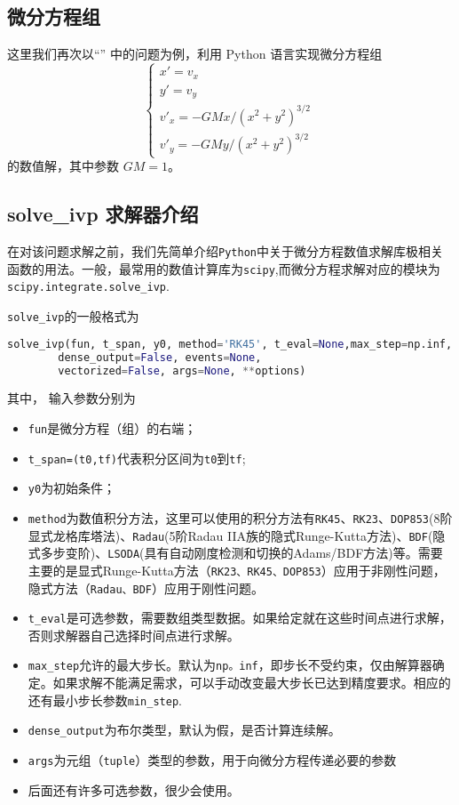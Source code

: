 \subsection{微分方程组}
这里我们再次以“” 中的问题为例，利用 Python 语言实现微分方程组
\begin{equation}\label{eq_PyIVP_10}
\begin{cases}
x' = v_x\\
y' = v_y\\
v'_x = -GMx/(x^2 + y^2)^{3/2}\\
v'_y = -GMy/(x^2 + y^2)^{3/2}
\end{cases}~
\end{equation}
的数值解，其中参数 $GM=1$。
\subsection{solve\_ivp 求解器介绍}
在对该问题求解之前，我们先简单介绍\verb`Python`中关于微分方程数值求解库极相关函数的用法。一般，最常用的数值计算库为\verb`scipy`,而微分方程求解对应的模块为\verb`scipy.integrate.solve_ivp`.

 \verb`solve_ivp`的一般格式为
 \begin{lstlisting}[language=python]
 solve_ivp(fun, t_span, y0, method='RK45', t_eval=None,max_step=np.inf,
        dense_output=False, events=None, 
        vectorized=False, args=None, **options)
 \end{lstlisting}
 其中， 输入参数分别为
\begin{itemize}
\item \verb`fun`是微分方程（组）的右端；
\item  \verb`t_span=(t0,tf)`代表积分区间为\verb`t0`到\verb`tf`;
\item  \verb`y0`为初始条件；
\item \verb`method`为数值积分方法，这里可以使用的积分方法有\verb`RK45`、\verb`RK23`、\verb`DOP853`(8阶显式龙格库塔法)、\verb`Radau`(5阶Radau IIA族的隐式Runge-Kutta方法)、\verb`BDF`(隐式多步变阶)、\verb`LSODA`(具有自动刚度检测和切换的Adams/BDF方法)等。需要主要的是显式Runge-Kutta方法（\verb`RK23、RK45、DOP853`）应用于非刚性问题，隐式方法（\verb`Radau、BDF`）应用于刚性问题。
\item \verb`t_eval`是可选参数，需要数组类型数据。如果给定就在这些时间点进行求解，否则求解器自己选择时间点进行求解。
\item \verb`max_step`允许的最大步长。默认为\verb`np。inf`，即步长不受约束，仅由解算器确定。如果求解不能满足需求，可以手动改变最大步长已达到精度要求。相应的还有最小步长参数\verb`min_step`.
\item \verb`dense_output`为布尔类型，默认为假，是否计算连续解。
\item \verb`args`为元组（\verb`tuple`）类型的参数，用于向微分方程传递必要的参数
\item 后面还有许多可选参数，很少会使用。
\end{itemize}

